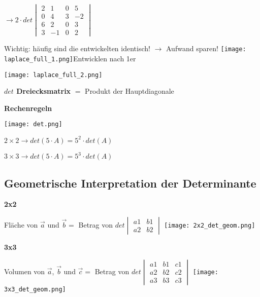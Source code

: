\begin{multicols*}{3}
{\begin{multicols}{2}
            {  $ \rightarrow  2 \cdot det \begin{vmatrix} 2 & 1 & 0 & 5 \\ 0 & 4 & 3 & -2 \\ 6 & 2 &0 & 3 \\ 3 & -1 &0 & 2 \end{vmatrix} $}
        \end{multicols}}
    {\small{Wichtig: häufig sind die entwickelten identisch! $\rightarrow$ Aufwand sparen!}}
    {\texttt{[image: laplace\_full\_1.png]}Entwicklen nach 1er}

    {\texttt{[image: laplace\_full\_2.png]}}


    \textbf{$det$ Dreiecksmatrix}
    $ = $ Produkt der Hauptdiagonale
    \WhiteSpace

    \textbf{Rechenregeln}

    {\texttt{[image: det.png]}}

    $2\times 2 \rightarrow det(5 \cdot A) = 5^2 \cdot det(A)$

    $3\times 3 \rightarrow det(5 \cdot A) = 5^3 \cdot det(A)$

    \WhiteSpace
    \subsection{Geometrische Interpretation der Determinante }
    {\textbf{2x2}}

    {Fläche von $\vec{a} $ und $ \vec{b} = $ Betrag von $ det \begin{vmatrix} a1 & b1  \\ a2 & b2 \end{vmatrix} $}
    {\texttt{[image: 2x2\_det\_geom.png]}}




    \textbf{3x3}

    {Volumen von $\vec{a} $, $ \vec{b}$ und $\vec{c} = $ Betrag von $   det \begin{vmatrix} a1 & b1 & c1 \\ a2 & b2 & c2 \\ a3 & b3 & c3  \end{vmatrix}  $}
    {\texttt{[image: 3x3\_det\_geom.png]}}
    \mbox{}
    \vfill\null
    \columnbreak


\end{multicols*}
